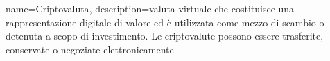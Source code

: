 {
	name={Criptovaluta},
	description={valuta virtuale che costituisce una rappresentazione digitale di valore ed è utilizzata come mezzo di scambio o detenuta a scopo di investimento. Le criptovalute possono essere trasferite, conservate o negoziate elettronicamente}
}